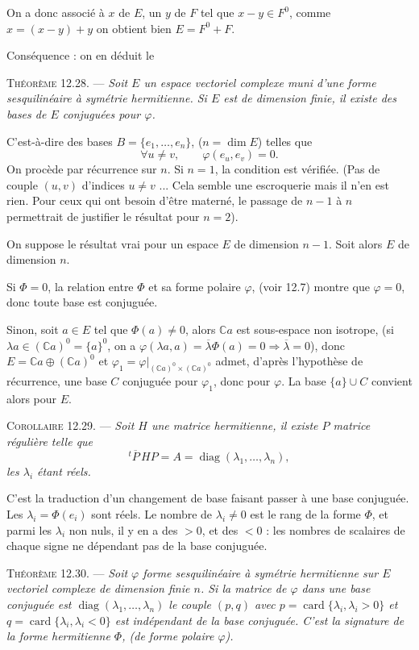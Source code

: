 On a donc associé à $x$ de $E$, un $y$ de $F$ tel que $x-y\in F^0$, comme $x=(x-y)+y$ on obtient bien $E=F^0+F$. \bookend

Conséquence : on en déduit le

\medskip\noindent\textsc{Théorème 12.28.} --- \emph{Soit $E$ un espace vectoriel complexe muni d'une forme sesquilinéaire à symétrie hermitienne. Si $E$ est de dimension finie, il existe des bases de $E$ conjuguées pour $\varphi$.}

C'est-à-dire des bases $B=\{e_1,\ldots,e_n\}$, ($n=\dim E$) telles que
\[
\forall u\ne v,\qquad \varphi(e_u,e_v)=0.
\]
On procède par récurrence sur $n$. Si $n=1$, la condition est vérifiée. (Pas de couple $(u,v)$ d'indices $u\ne v$ ... Cela semble une escroquerie mais il n'en est rien. Pour ceux qui ont besoin d'être materné, le passage de $n-1$ à $n$ permettrait de justifier le résultat pour $n=2$).

On suppose le résultat vrai pour un espace $E$ de dimension $n-1$. Soit alors $E$ de dimension $n$.

Si $\Phi=0$, la relation entre $\Phi$ et sa forme polaire $\varphi$, (voir 12.7) montre que $\varphi=0$, donc toute base est conjuguée.

Sinon, soit $a\in E$ tel que $\Phi(a)\ne0$, alors $\mathbb Ca$ est sous-espace non isotrope, (si $\lambda a\in(\mathbb Ca)^0=\{a\}^0$, on a $\varphi(\lambda a,a)=\overline\lambda\Phi(a)=0\Rightarrow\overline\lambda=0$), donc $E=\mathbb Ca\oplus(\mathbb Ca)^0$ et $\varphi_1=\varphi|_{(\mathbb Ca)^0\times(\mathbb Ca)^0}$ admet, d'après l'hypothèse de récurrence, une base $C$ conjuguée pour $\varphi_1$, donc pour $\varphi$. La base $\{a\}\cup C$ convient alors pour $E$. \bookend

\medskip\noindent\textsc{Corollaire 12.29.} --- \emph{Soit $H$ une matrice hermitienne, il existe $P$ matrice régulière telle que
\[
{}^t\!\overline P\,HP=A=\operatorname{diag}(\lambda_1,\ldots,\lambda_n),
\]
les $\lambda_i$ étant réels.}

C'est la traduction d'un changement de base faisant passer à une base conjuguée. Les $\lambda_i=\Phi(e_i)$ sont réels. Le nombre de $\lambda_i\ne0$ est le rang de la forme $\Phi$, et parmi les $\lambda_i$ non nuls, il y en a des $>0$, et des $<0$ : les nombres de scalaires de chaque signe ne dépendant pas de la base conjuguée. \bookend

\medskip\noindent\textsc{Théorème 12.30.} --- \emph{Soit $\varphi$ forme sesquilinéaire à symétrie hermitienne sur $E$ vectoriel complexe de dimension finie $n$. Si la matrice de $\varphi$ dans une base conjuguée est $\operatorname{diag}(\lambda_1,\ldots,\lambda_n)$ le couple $(p,q)$ avec $p=\operatorname{card}\{\lambda_i,\lambda_i>0\}$ et $q=\operatorname{card}\{\lambda_i,\lambda_i<0\}$ est indépendant de la base conjuguée. C'est la signature de la forme hermitienne $\Phi$, (de forme polaire $\varphi$).}

